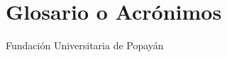 %
\section*{Glosario o Acrónimos}
\label{sec::acronimos}

\vspace{10 mm}
\begin{description}[align=right,labelwidth=2cm] 
    \item [FUP] Fundación Universitaria de Popayán
\end{description}

